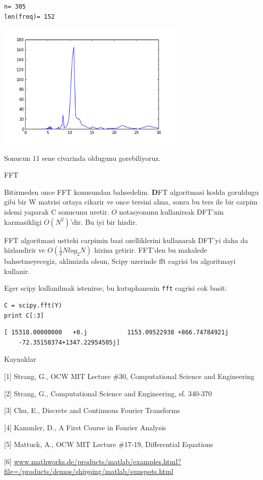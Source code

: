 \documentclass[12pt,fleqn]{article}\usepackage{../common}
\begin{document}
\begin{verbatim}
n= 305
len(freq)= 152
\end{verbatim}
\includegraphics[height=6cm]{fourier_02.png}


Sonucun 11 sene civarinda oldugunu gorebiliyoruz. 

FFT

Bitirmeden once FFT konusundan bahsedelim. $\textbf{D}$FT algoritmasi
kodda goruldugu gibi bir W matrisi ortaya cikarir ve once tersini
alma, sonra bu ters ile bir carpim islemi yaparak C sonucunu
uretir. $O$ notasyonunu kullanirsak DFT'nin karmasikligi
$O(N^2)$'dir. Bu iyi bir hizdir.

FFT algoritmasi ustteki carpimin bazi ozelliklerini kullanarak DFT'yi
daha da hizlandirir ve $O(\frac{1}{2}Nlog_2N)$ hizina getirir. FFT'den
bu makalede bahsetmeyecegiz, aklimizda olsun, Scipy uzerinde fft
cagrisi bu algoritmayi kullanir.

Eger scipy kullanilmak istenirse, bu kutuphanenin \verb!fft! cagrisi cok
basit:

\begin{verbatim}
C = scipy.fft(Y)
print C[:3]
\end{verbatim}

\begin{verbatim}
[ 15318.00000000   +0.j           1153.09522938 +866.74784921j
    -72.35158374+1347.22954505j]
\end{verbatim}

Kaynaklar

[1] Strang, G., OCW MIT Lecture \#30, Computational Science and Engineering

[2] Strang, G., Computational Science and Engineering, sf. 340-370

[3] Chu, E., Discrete and Continuous Fourier Transforms

[4] Kammler, D., A First Course in Fourier Analysis

[5] Mattuck, A., OCW MIT Lecture \#17-19, Differential Equations

[6] \url{www.mathworks.de/products/matlab/examples.html?file=/products/demos/shipping/matlab/sunspots.html}
\end{document}
